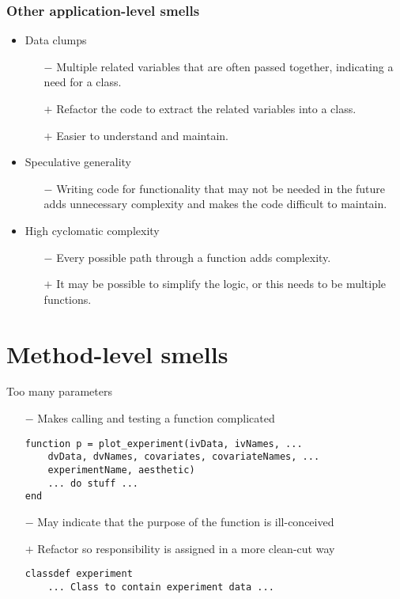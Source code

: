\documentclass{beamer}
\begin{document}
\begin{frame}[fragile]
\frametitle{Other application-level smells}
\begin{itemize}
\item Data clumps
\begin{itemize}
\item[$-$] Multiple related variables that are often passed together, indicating a need for a class.
\item[$+$] Refactor the code to extract the related variables into a class. 
\item[$+$] Easier to understand and maintain.
\end{itemize}
\item {Speculative generality}
\begin{itemize}
\item[$-$] 
Writing code for functionality that may not be needed in the future adds unnecessary complexity and makes the code difficult to maintain.
\end{itemize}
\item {High cyclomatic complexity}
\begin{itemize}
\item[$-$] Every possible path through a function adds complexity. 
\item[$+$] It may be possible to simplify the logic, or this needs to be multiple functions.
\end{itemize}
\end{itemize}
\end{frame}


\section{Method-level smells}

\begin{frame}[fragile]{Too many parameters}

\begin{itemize}
    \item[$-$] Makes calling and testing a function complicated
\begin{lstlisting}[style=MATLAB]
function p = plot_experiment(ivData, ivNames, ...
    dvData, dvNames, covariates, covariateNames, ...
    experimentName, aesthetic)
    ... do stuff ...
end
\end{lstlisting}
    \item[$-$] May indicate that the purpose of the function is ill-conceived
    \item[$+$] Refactor so responsibility is assigned in a more clean-cut way
\begin{lstlisting}[style=MATLAB]
classdef experiment
    ... Class to contain experiment data ...
\end{lstlisting}
\end{itemize}
\end{frame}
\end{document}
